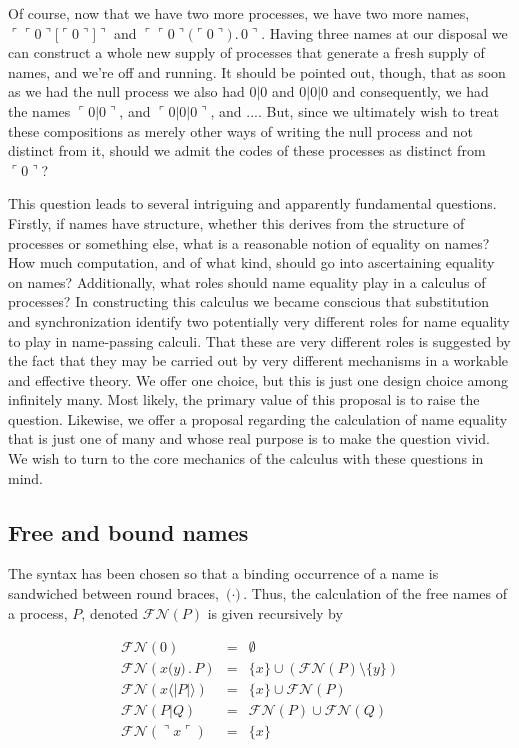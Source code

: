 \documentclass[]{entcs}
\newcommand{\lliftb}{\langle\!|}
\newcommand{\rliftb}{|\!\rangle}
\newcommand{\lpquote}{\ulcorner}
\newcommand{\rpquote}{\urcorner}
\newcommand{\id}[1]{\texttt{#1}}
\newcommand{\pzero}{\mathbin{0}}
\newcommand{\juxtap}{\mathbin{\id{|}}}
\newcommand{\concat}{\mathbin{.}}
\newcommand{\freenames}[1]{\mathbin{\mathcal{FN}(#1)}}
\newcommand{\binpar}[2]{#1 \juxtap #2}
\newcommand{\lift}[2]{#1 \lliftb #2 \rliftb}
\newcommand{\quotep}[1]{\lpquote #1 \rpquote}
\newcommand{\dropn}[1]{\rpquote #1 \lpquote}
\begin{document}
Of course, now that we have two more processes, we have two more
names, $\quotep{\quotep{0}\id{[}{\quotep{0}}\id{]}}$ and
$\quotep{\quotep{0}\id{(}{\quotep{0}}\id{)} \concat 0}$. Having three
names at our disposal we can construct a whole new supply of processes
that generate a fresh supply of names, and we're off and running. It
should be pointed out, though, that as soon as we had the null process
we also had $0 \juxtap 0$ and $0 \juxtap 0 \juxtap 0$ and
consequently, we had the names $\quotep{ 0 \juxtap 0 }$, and $\quotep{
0 \juxtap 0 \juxtap 0}$, and .... But, since we ultimately wish to
treat these compositions as merely other ways of writing the null
process and not distinct from it, should we admit the codes of these
processes as distinct from $\quotep{0}$?

This question leads to several intriguing and apparently fundamental
questions. Firstly, if names have structure, whether this derives from
the structure of processes or something else, what is a reasonable
notion of equality on names? How much computation, and of what kind,
should go into ascertaining equality on names? Additionally, what
roles should name equality play in a calculus of processes? In
constructing this calculus we became conscious that substitution and
synchronization identify two potentially very different roles for name
equality to play in name-passing calculi. That these are very
different roles is suggested by the fact that they may be carried out
by very different mechanisms in a workable and effective theory. We
offer one choice, but this is just one design choice among infinitely
many. Most likely, the primary value of this proposal is to raise the
question. Likewise, we offer a proposal regarding the calculation of
name equality that is just one of many and whose real purpose is to
make the question vivid. We wish to turn to the core mechanics of the
calculus with these questions in mind.

\subsection{Free and bound names}

The syntax has been chosen so that a binding occurrence of a name is
sandwiched between round braces, $\id{(} \cdot \id{)}$. Thus, the
calculation of the free names of a process, $P$, denoted
$\freenames{P}$ is given recursively by

	\begin{eqnarray}
		\freenames{\pzero} & = & \emptyset \nonumber\\
		\freenames{x \id{(}y\id{)} \concat P} & = & \{ x \} \cup (\freenames{P} \setminus \{ y \}) \nonumber\\
		\freenames{\lift{x}{P}} & = & \{ x \} \cup \freenames{P} \nonumber\\
		\freenames{\binpar{P}{Q}} & = & \freenames{P} \cup \freenames{Q} \nonumber\\
		\freenames{\dropn{x}} & = & \{ x \} \nonumber
	\end{eqnarray}
\end{document}
